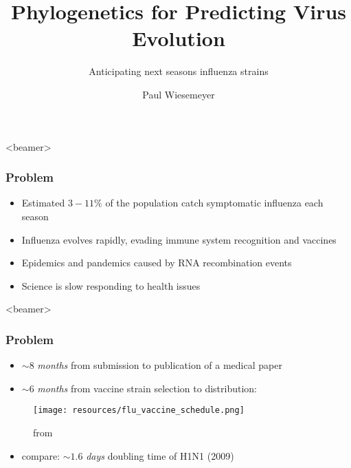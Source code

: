 \documentclass{beamer}
\title{Phylogenetics for Predicting Virus Evolution}
\subtitle{Anticipating next seasons influenza strains}
\author{Paul Wiesemeyer}
\begin{document}
  \shorthandoff{-}
  \frame{\maketitle}

  
    
  \begin{darkframes}




  \begin{frame}<beamer>
    \frametitle{Problem}


    \begin{itemize}
      \itemsep1em
      \item Estimated $3 - 11 \% $ of the population catch symptomatic influenza each season \cite{tokarsOlsen+18a}
      \item Influenza evolves rapidly, evading immune system recognition and vaccines
      \item Epidemics and pandemics caused by RNA recombination events
      \item Science is slow responding to health issues
    \end{itemize}
  \end{frame}

  \begin{frame}<beamer>
    \frametitle{Problem}
    \begin{itemize}
      \item {\Large $\sim 8$ \textit{months}} from submission to publication of a medical paper \cite{aAMC18}
      \item {\Large $\sim 6$ \textit{months}} from vaccine strain selection to distribution:
    \end{itemize}
    \begin{figure}
        \texttt{[image: resources/flu\_vaccine\_schedule.png]}
        \caption{\footnotesize from \cite{bedford15}}
    \end{figure}{}
    \begin{itemize}
      \item compare: {\LARGE $\sim 1.6$ \textit{days}} doubling time of H1N1 (2009) \\
      \footnotesize \cite{mostaco-GuidolinGreer+11}
    \end{itemize}
    

\end{frame}
\end{darkframes}
\end{document}
